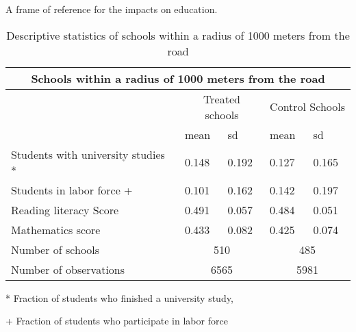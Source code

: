 \documentclass[9pt]{beamer}
\begin{document}
\begin{frame}{A frame of reference for the impacts on education.}
\hyperlink{data}{}
\begin{center}
\begin{table}[h!]
\caption{Descriptive statistics of schools within a radius of 1000 meters from the road}
\label{tab:my-table}
\begin{tabular}{lllll}
\hline
\multicolumn{5}{c}{Schools within a radius of 1000 meters from the road} \\ \hline
& \multicolumn{2}{c}{Treated schools} & \multicolumn{2}{c}{Control Schools} \\ \cline{2-5} 
& mean & sd & mean & sd \\ \hline
Students with university studies * & 0.148 & 0.192 & 0.127 & 0.165 \\
Students in labor force + & 0.101 & 0.162 & 0.142 & 0.197 \\
Reading literacy Score & 0.491 & 0.057 & 0.484 & 0.051 \\
Mathematics score & 0.433 & 0.082 & 0.425 & 0.074 \\ \hline
Number of schools & \multicolumn{2}{c}{510} & \multicolumn{2}{c}{485} \\
Number of observations & \multicolumn{2}{c}{6565} & \multicolumn{2}{c}{5981} \\ \hline
\end{tabular}
\end{table}
\begin{threeparttable}
\begin{tablenotes}
\small
\item[*] Fraction of students who finished a university study,
\item[+] Fraction of students who participate in labor force
\end{tablenotes}
\end{threeparttable}
\end{center}  
\end{frame}

         
\end{document}
